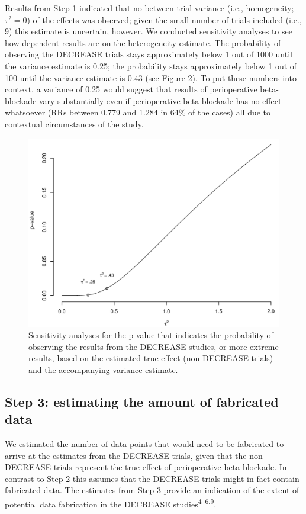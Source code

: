 \documentclass[]{article}
\begin{document}
Results from Step 1 indicated that no between-trial variance (i.e.,
homogeneity; \(\tau^2=0\)) of the effects was observed; given the small
number of trials included (i.e., 9) this estimate is uncertain, however.
We conducted sensitivity analyses to see how dependent results are on
the heterogeneity estimate. The probability of observing the DECREASE
trials stays approximately below 1 out of 1000 until the variance
estimate is 0.25; the probability stays approximately below 1 out of 100
until the variance estimate is 0.43 (see Figure 2). To put these numbers
into context, a variance of 0.25 would suggest that results of
perioperative beta-blockade vary substantially even if perioperative
beta-blockade has no effect whatsoever (RRs between 0.779 and 1.284 in
64\% of the cases) all due to contextual circumstances of the study.

\begin{figure}

{\centering \includegraphics[width=0.8\linewidth]{../figures/fig2} 

}

\caption{Sensitivity analyses for the p-value that indicates the probability of observing the results from the DECREASE studies, or more extreme results, based on the estimated true effect (non-DECREASE trials) and the accompanying variance estimate.}\label{fig:figure 2}
\end{figure}

\subsection{Step 3: estimating the amount of fabricated
data}\label{step-3-estimating-the-amount-of-fabricated-data}

We estimated the number of data points that would need to be fabricated
to arrive at the estimates from the DECREASE trials, given that the
non-DECREASE trials represent the true effect of perioperative
beta-blockade. In contrast to Step 2 this assumes that the DECREASE
trials might in fact contain fabricated data. The estimates from Step 3
provide an indication of the extent of potential data fabrication in the
DECREASE studies\textsuperscript{4--6,9}.
\end{document}
